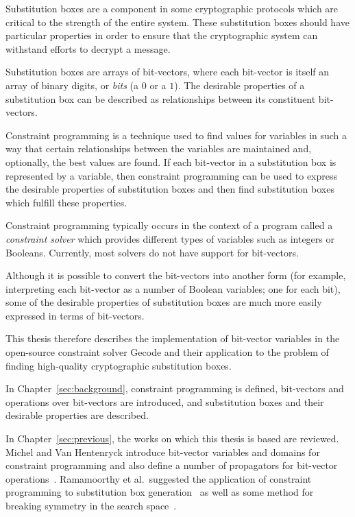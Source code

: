 \documentclass[a4paper,10pt,twoside,openright]{book}
\begin{document}
Substitution boxes are a component in some cryptographic protocols which are critical to the strength of the entire system. These substitution boxes should have particular properties in order to ensure that the cryptographic system can withstand efforts to decrypt a message. 

Substitution boxes are arrays of bit-vectors, where each bit-vector is itself an array of binary digits, or \textit{bits} (a $0$ or a $1$). The desirable properties of a substitution box can be described as relationships between its constituent bit-vectors.

Constraint programming is a technique used to find values for variables in such a way that certain relationships between the variables are maintained and, optionally, the best values are found. If each bit-vector in a substitution box is represented by a variable, then constraint programming can be used to express the desirable properties of substitution boxes and then find substitution boxes which fulfill these properties.

Constraint programming typically occurs in the context of a program called a \textit{constraint solver} which provides different types of variables such as integers or Booleans. Currently, most solvers do not have support for bit-vectors.

Although it is possible to convert the bit-vectors into another form (for example, interpreting each bit-vector as a number of Boolean variables; one for each bit), some of the desirable properties of substitution boxes are much more easily expressed in terms of bit-vectors. 

This thesis therefore describes the implementation of bit-vector variables in the open-source constraint solver Gecode and their application to the problem of finding high-quality cryptographic substitution boxes. 

In Chapter~\ref{sec:background}, constraint programming is defined, bit-vectors and operations over bit-vectors are introduced, and substitution boxes and their desirable properties are described.

In Chapter~\ref{sec:previous}, the works on which this thesis is based are reviewed. 
Michel and Van Hentenryck introduce bit-vector variables and domains for constraint programming and also define a number of propagators for bit-vector operations~\cite{bitvectors}.
Ramamoorthy et al.\ suggested the application of constraint programming to substitution box generation~\cite{sboxes} as well as some method for breaking symmetry in the search space~\cite{sboxsymmetry}.
\end{document}
